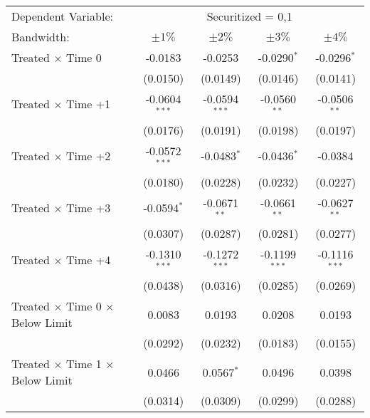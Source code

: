 \begin{tabular*}{0.8\textwidth}{@{\extracolsep{\fill}}lcccc}
   \toprule
   Dependent Variable: & \multicolumn{4}{c}{Securitized = 0,1}\\
   Bandwidth:                                          & $\pm1\%$            & $\pm2\%$            & $\pm3\%$            & $\pm4\%$  \\  
   \midrule
    Treated $\times$ Time 0                          & -0.0183         & -0.0253         & -0.0290$^{*}$   & -0.0296$^{*}$\\   
                                                     & (0.0150)        & (0.0149)        & (0.0146)        & (0.0141)\\   
    Treated $\times$ Time +1                         & -0.0604$^{***}$ & -0.0594$^{***}$ & -0.0560$^{**}$  & -0.0506$^{**}$\\   
                                                     & (0.0176)        & (0.0191)        & (0.0198)        & (0.0197)\\   
    Treated $\times$ Time +2                         & -0.0572$^{***}$ & -0.0483$^{*}$   & -0.0436$^{*}$   & -0.0384\\   
                                                     & (0.0180)        & (0.0228)        & (0.0232)        & (0.0227)\\   
    Treated $\times$ Time +3                         & -0.0594$^{*}$   & -0.0671$^{**}$  & -0.0661$^{**}$  & -0.0627$^{**}$\\   
                                                     & (0.0307)        & (0.0287)        & (0.0281)        & (0.0277)\\   
    Treated $\times$ Time +4                         & -0.1310$^{***}$ & -0.1272$^{***}$ & -0.1199$^{***}$ & -0.1116$^{***}$\\   
                                                     & (0.0438)        & (0.0316)        & (0.0285)        & (0.0269)\\   
   Treated $\times$ Time 0 $\times$ Below Limit      & 0.0083          & 0.0193          & 0.0208          & 0.0193\\   
                                                     & (0.0292)        & (0.0232)        & (0.0183)        & (0.0155)\\   
   Treated $\times$ Time 1 $\times$ Below Limit      & 0.0466          & 0.0567$^{*}$    & 0.0496          & 0.0398\\   
                                                     & (0.0314)        & (0.0309)        & (0.0299)        & (0.0288)\\   

\end{tabular*}
